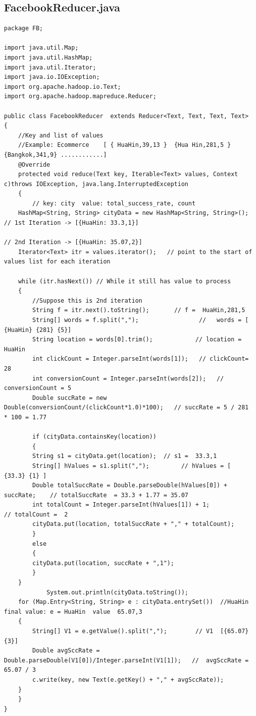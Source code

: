 \documentclass[11pt]{article}
\begin{document}
\subsection*{FacebookReducer.java}
\begin{lstlisting}
package FB;

import java.util.Map;
import java.util.HashMap;
import java.util.Iterator;
import java.io.IOException;
import org.apache.hadoop.io.Text;
import org.apache.hadoop.mapreduce.Reducer;

public class FacebookReducer  extends Reducer<Text, Text, Text, Text>
{
	//Key and list of values
	//Example: Ecommerce    [ { HuaHin,39,13 }  {Hua Hin,281,5 } {Bangkok,341,9} ............]
    @Override
    protected void reduce(Text key, Iterable<Text> values, Context c)throws IOException, java.lang.InterruptedException
    {
    	// key: city  value: total_success_rate, count
	HashMap<String, String> cityData = new HashMap<String, String>();  // 1st Iteration -> [{HuaHin: 33.3,1}]
																	   // 2nd Iteration -> [{HuaHin: 35.07,2}]
	Iterator<Text> itr = values.iterator();   // point to the start of values list for each iteration
	
	while (itr.hasNext()) // While it still has value to process
	{
		//Suppose this is 2nd iteration
	    String f = itr.next().toString();       // f =  HuaHin,281,5
	    String[] words = f.split(",");                 //   words = [ {HuaHin} {281} {5}]
	    String location = words[0].trim();            // location = HuaHin
	    int clickCount = Integer.parseInt(words[1]);   // clickCount= 28
	    int conversionCount = Integer.parseInt(words[2]);   //  conversionCount = 5 
	    Double succRate = new Double(conversionCount/(clickCount*1.0)*100);   // succRate = 5 / 281 * 100 = 1.77

	    if (cityData.containsKey(location))
	    {
	    String s1 = cityData.get(location);  // s1 =  33.3,1
		String[] hValues = s1.split(",");         // hValues = [ {33.3} {1} ]            
		Double totalSuccRate = Double.parseDouble(hValues[0]) + succRate;    // totalSuccRate  = 33.3 + 1.77 = 35.07 
		int totalCount = Integer.parseInt(hValues[1]) + 1;             // totalCount =  2
		cityData.put(location, totalSuccRate + "," + totalCount);
	    }
		else
	    {
		cityData.put(location, succRate + ",1");
	    }
	}
            System.out.println(cityData.toString());
	for (Map.Entry<String, String> e : cityData.entrySet())  //HuaHin final value: e = HuaHin  value  65.07,3
	{
	    String[] V1 = e.getValue().split(",");        // V1  [{65.07} {3}]
	    Double avgSccRate = Double.parseDouble(V1[0])/Integer.parseInt(V1[1]);   //  avgSccRate = 65.07 / 3
	    c.write(key, new Text(e.getKey() + "," + avgSccRate));
	}
    }
}


\end{lstlisting}
\end{document}
